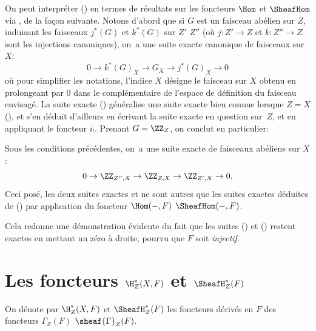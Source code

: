 On peut interpr\'eter () en termes de r\'esultats sur les
foncteurs $\Hom$ et $\SheafHom$ via , de la fa\c con
suivante. Notons d'abord que si $G$ est un faisceau ab\'elien sur
$Z$, induisant les faisceaux $j^*(G)$ et $k^*(G)$ sur $Z'$ \resp
$Z''$ (o\`u $j: Z' \to Z$ et $k: Z'' \to Z$ sont les injections
canoniques), on~a une suite exacte canonique de faisceaux sur $X$:
\begin{equation} \label{eq:I.17} {0 \to k^*(G)_X \to G_X \to j^*(G)_X \to 0}
\end{equation}
o\`u pour simplifier les notations, l'indice $X$ d\'esigne le faisceau sur $X$ obtenu en prolongeant par $0$ dans le compl\'ementaire de l'espace de d\'efinition du faisceau envisag\'e. La suite exacte () g\'en\'eralise une suite exacte bien connue lorsque $Z=X$ (\cf {}), et s'en d\'eduit d'ailleurs en \'ecrivant la suite exacte en question sur~$Z$, et en appliquant le foncteur $i_!$. Prenant $G=\ZZ_{Z}$, on conclut en particulier:

\begin{proposition} \label{I.1.10}
Sous les conditions pr\'ec\'edentes, on~a une suite exacte de faisceaux ab\'eliens sur $X$:
\begin{equation} \label{eq:I.18} {0 \to \ZZ_{Z{''}, X} \to \ZZ_{Z, X} \to \ZZ_{Z', X} \to 0}.
\end{equation}
Ceci pos\'e, les deux suites exactes  et  ne sont autres que les suites exactes d\'eduites de () par application du foncteur $\Hom(-, F)$ \resp $\SheafHom(-, F)$.
\end{proposition}

Cela redonne une d\'emonstration \'evidente du fait que les suites () et () restent exactes en mettant un z\'ero \`a droite, pourvu que $F$ soit \textit{injectif}.

\section{Les foncteurs $\H_Z^*(X, F)$ et $\SheafH_Z^*(F)$} \label{I.2}
\pageoriginale
\sisi{\ignorespaces}{\setcounter{equation}{18}}

\begin{definition} \label{I.2.1}
On d\'enote par $\H_Z^*(X, F)$ et ${\SheafH}_Z^*(F)$ les foncteurs d\'eriv\'es en $F$ des foncteurs $\Gamma_Z(F)$ \resp $\sheaf{\Gamma}_Z(F)$.
\end{definition}


